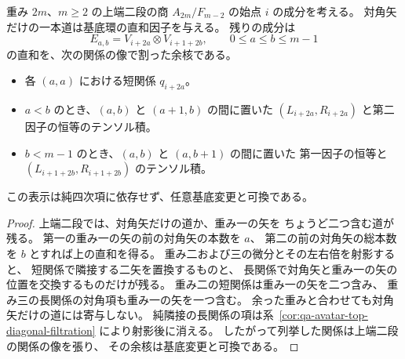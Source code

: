 \begin{proposition}[偶数重みの上端二段の有限表示]
\label{prop:qa-avatar-even-top-diagonals}
重み $2m$、$m\geq2$ の上端二段の商
$A_{2m}/F_{m-2}$ の始点 $i$ の成分を考える。
対角矢だけの一本道は基底環の直和因子を与える。
残りの成分は
\[
 E_{a,b}=V_{i+2a}\otimes V_{i+1+2b},
 \qquad 0\le a\le b\le m-1
\]
の直和を、次の関係の像で割った余核である。
\begin{itemize}
 \item 各 $(a,a)$ における短関係 $q_{i+2a}$。
 \item $a<b$ のとき、$(a,b)$ と $(a+1,b)$ の間に置いた
 $(L_{i+2a},R_{i+2a})$ と第二因子の恒等のテンソル積。
 \item $b<m-1$ のとき、$(a,b)$ と $(a,b+1)$ の間に置いた
 第一因子の恒等と $(L_{i+1+2b},R_{i+1+2b})$ のテンソル積。
\end{itemize}
この表示は純四次項に依存せず、任意基底変更と可換である。
\end{proposition}
\begin{proof}
上端二段では、対角矢だけの道か、重み一の矢を
ちょうど二つ含む道が残る。
第一の重み一の矢の前の対角矢の本数を $a$、
第二の前の対角矢の総本数を $b$ とすれば上の直和を得る。
重み二および三の微分とその左右倍を射影すると、
短関係で隣接する二矢を置換するものと、
長関係で対角矢と重み一の矢の位置を交換するものだけが残る。
重み二の短関係は重み一の矢を二つ含み、
重み三の長関係の対角項も重み一の矢を一つ含む。
余った重みと合わせても対角矢だけの道には寄与しない。
純隣接の長関係の項は系~\ref{cor:qa-avatar-top-diagonal-filtration}
により射影後に消える。
したがって列挙した関係は上端二段の関係の像を張り、
その余核は基底変更と可換である。
\end{proof}

